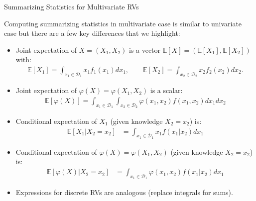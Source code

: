\documentclass[9pt]{beamer}
\begin{document}
%
\begin{frame}{Summarizing Statistics for Multivariate RVs}

Computing summarizing statistics in multivariate case is similar to univariate case but there are a few key differences that we highlight:
\begin{itemize}
\item Joint expectation of $X=(X_1,X_2)$ is a vector $\mathbb{E}[X]=(\mathbb{E}[X_1],\mathbb{E}[X_2])$ with:
\begin{align*}
\mathbb{E}[X_1]=\int_{x_1\in \mathcal{D}_1}x_1f_1(x_1)dx_1,\qquad \mathbb{E}[X_2]=\int_{x_2\in \mathcal{D}_2}x_2f_2(x_2)dx_2.
\end{align*}
\item Joint expectation of $\varphi(X)=\varphi(X_1,X_2)$ is a scalar:
 \begin{align*}
\mathbb{E}[\varphi(X)]=\int_{x_1\in \mathcal{D}_1}\int_{x_2\in\mathcal{D}_2}\varphi(x_1,x_2)f(x_1,x_2)dx_1dx_2
\end{align*}
\item Conditional expectation of $X_1$ (given knowledge $X_2=x_2$) is:
 \begin{align*}
\mathbb{E}[X_1|X_2=x_2]&=\int_{x_1\in \mathcal{D}_1}x_1f(x_1|x_2)dx_1
\end{align*}
\item Conditional expectation of $\varphi(X)=\varphi(X_1,X_2)$ (given knowledge $X_2=x_2$) is:
 \begin{align*}
\mathbb{E}[\varphi(X)|X_2=x_2]&=\int_{x_1\in \mathcal{D}_1}\varphi(x_1,x_2)f(x_1|x_2)dx_1
\end{align*}
\item Expressions for discrete RVs are analogous (replace integrals for sums). 

\end{itemize}

\end{frame}
\end{document}
